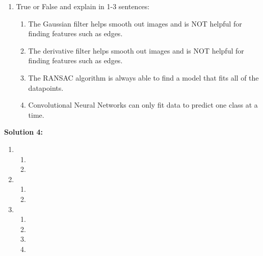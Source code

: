 \documentclass[]{article}
\begin{document}
\begin{enumerate}[label=(\alph*)]
    \item True or False and explain in 1-3 sentences:
        \begin{enumerate}[label=(\roman*)]
            \item The Gaussian filter helps smooth out images and is NOT helpful for finding features such as edges.
            \item The derivative filter helps smooth out images and is NOT helpful for finding features such as edges.
            \item The RANSAC algorithm is always able to find a model that fits all of the datapoints.
            \item Convolutional Neural Networks can only fit data to predict one class at a time.
        \end{enumerate}
    
\end{enumerate}

\textbf{Solution 4:}
\begin{enumerate}[label=(\alph*)]
    \item \begin{enumerate}[label=(\roman*)]
            \item %
            \item %
          \end{enumerate}    
    
    \item \begin{enumerate}[label=(\roman*)]
            \item %
            \item %
        \end{enumerate}
    
    \item \begin{enumerate}[label=(\roman*)]
            \item %
            \item %
            \item %
            \item %
        \end{enumerate}
\end{enumerate}
\end{document}
